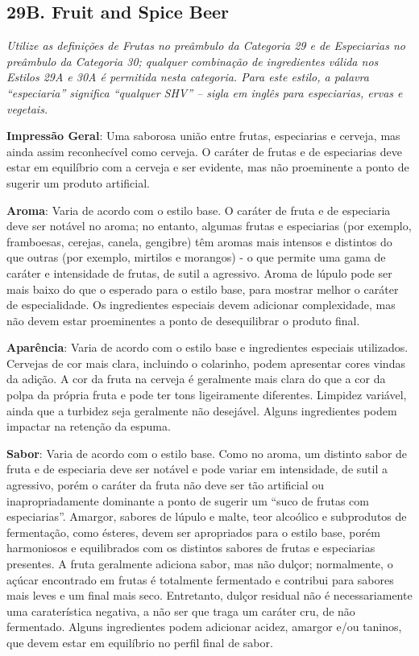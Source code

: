 \subsection*{29B. Fruit and Spice Beer}
\textit{Utilize as definições de Frutas no preâmbulo da Categoria 29 e de Especiarias no preâmbulo da Categoria 30; qualquer combinação de ingredientes válida nos Estilos 29A e 30A é permitida nesta categoria. Para este estilo, a palavra “especiaria” significa “qualquer SHV” – sigla em inglês para especiarias, ervas e vegetais.}

\textbf{Impressão Geral}: Uma saborosa união entre frutas, especiarias e cerveja, mas ainda assim reconhecível como cerveja. O caráter de frutas e de especiarias deve estar em equilíbrio com a cerveja e ser evidente, mas não proeminente a ponto de sugerir um produto artificial.

\textbf{Aroma}: Varia de acordo com o estilo base. O caráter de fruta e de especiaria deve ser notável no aroma; no entanto, algumas frutas e especiarias (por exemplo, framboesas, cerejas, canela, gengibre) têm aromas mais intensos e distintos do que outras (por exemplo, mirtilos e morangos) - o que permite uma gama de caráter e intensidade de frutas, de sutil a agressivo. Aroma de lúpulo pode ser mais baixo do que o esperado para o estilo base, para mostrar melhor o caráter de especialidade. Os ingredientes especiais devem adicionar complexidade, mas não devem estar proeminentes a ponto de desequilibrar o produto final.

\textbf{Aparência}: Varia de acordo com o estilo base e ingredientes especiais utilizados. Cervejas de cor mais clara, incluindo o colarinho, podem apresentar cores vindas da adição. A cor da fruta na cerveja é geralmente mais clara do que a cor da polpa da própria fruta e pode ter tons ligeiramente diferentes. Limpidez variável, ainda que a turbidez seja geralmente não desejável. Alguns ingredientes podem impactar na retenção da espuma.

\textbf{Sabor}: Varia de acordo com o estilo base. Como no aroma, um distinto sabor de fruta e de especiaria deve ser notável e pode variar em intensidade, de sutil a agressivo, porém o caráter da fruta não deve ser tão artificial ou inapropriadamente dominante a ponto de sugerir um “suco de frutas com especiarias”. Amargor, sabores de lúpulo e malte, teor alcoólico e subprodutos de fermentação, como ésteres, devem ser apropriados para o estilo base, porém harmoniosos e equilibrados com os distintos sabores de frutas e especiarias presentes. A fruta geralmente adiciona sabor, mas não dulçor; normalmente, o açúcar encontrado em frutas é totalmente fermentado e contribui para sabores mais leves e um final mais seco. Entretanto, dulçor residual não é necessariamente uma caraterística negativa, a não ser que traga um caráter cru, de não fermentado. Alguns ingredientes podem adicionar acidez, amargor e/ou taninos, que devem estar em equilíbrio no perfil final de sabor.

